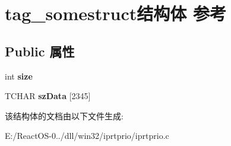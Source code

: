\hypertarget{structtag__somestruct}{}\section{tag\+\_\+somestruct结构体 参考}
\label{structtag__somestruct}
\subsection*{Public 属性}
\begin{DoxyCompactItemize}
\item 
\mbox{\label{structtag__somestruct_ac35d81f20c2625839bdb0239341e61ee}} 
int {\bfseries size}
\item 
\mbox{\label{structtag__somestruct_a7b04ca852a0427bfe50537b221f8510d}} 
T\+C\+H\+AR {\bfseries sz\+Data} \mbox{[}2345\mbox{]}
\end{DoxyCompactItemize}


该结构体的文档由以下文件生成\+:\begin{DoxyCompactItemize}
\item 
E\+:/\+React\+O\+S-\/0../dll/win32/iprtprio/iprtprio.\+c\end{DoxyCompactItemize}
